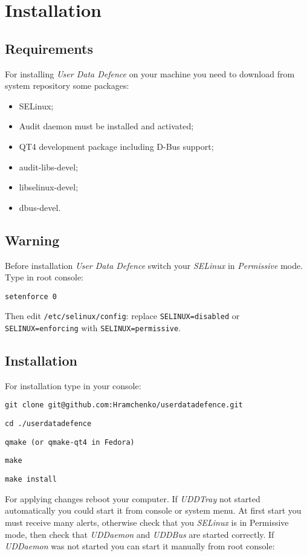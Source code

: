 \chapter{Installation}
\section{Requirements}

For installing \emph{User Data Defence} on your machine you need to
download from system repository some packages:

\begin{itemize}
\item
  SELinux;
\item
  Audit daemon must be installed and activated;
\item
  QT4 development package including D-Bus support;
\item
  audit-libs-devel;
\item
  libselinux-devel;
\item
  dbus-devel.
\end{itemize}

\section{Warning}

Before installation \emph{User Data Defence} switch your \emph{SELinux}
in \emph{Permissive} mode. Type in root console:

\texttt{setenforce 0}

Then edit \texttt{/etc/selinux/config}: replace
\texttt{SELINUX=disabled} or \texttt{SELINUX=enforcing} with
\texttt{SELINUX=permissive}.

\section{Installation}

For installation type in your console:

\texttt{git clone git@github.com:Hramchenko/userdatadefence.git}

\texttt{cd ./userdatadefence}

\texttt{qmake (or qmake-qt4 in Fedora)}

\texttt{make}

\texttt{make install}

For applying changes reboot your computer. If \emph{UDDTray} not started
automatically you could start it from console or system menu. At first
start you must receive many alerts, otherwise check that you
\emph{SELinux} is in Permissive mode, then check that \emph{UDDaemon}
and \emph{UDDBus} are started correctly. If \emph{UDDaemon} was not
started you can start it manually from root console:

